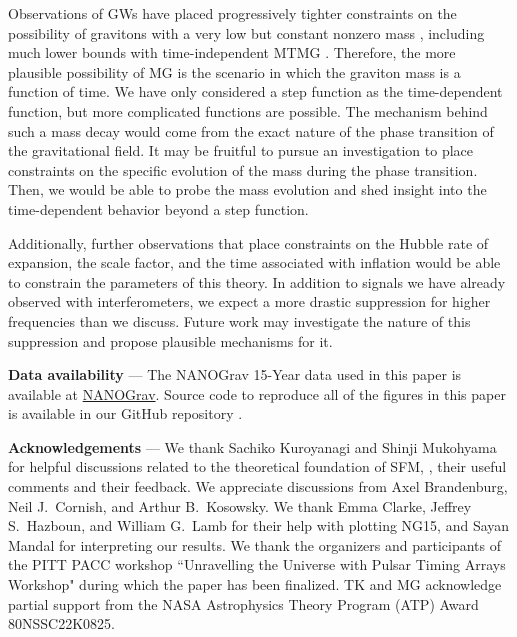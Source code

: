 \documentclass[prd,twocolumn,aps,psfig,nofootinbib,nobibnotes,superscriptaddress,preprintnumbers,times]{revtex4-2}
\begin{document}
Observations of GWs have placed progressively tighter constraints on the possibility of gravitons with a very low but constant nonzero mass \cite{Bernardo:2023mxc, Wu:2023rib, Wang:2023div, deRham:2016nuf}, including much lower bounds with time-independent MTMG \cite{DeFelice:2021trp, DeFelice:2023bwq}. Therefore, the more plausible possibility of MG is the scenario in which the graviton mass is a function of time. We have only considered a step function as the time-dependent function, but more complicated functions are possible. The mechanism behind such a mass decay would come from the exact nature of the phase transition of the gravitational field. It may be fruitful to pursue an investigation to place constraints on the specific evolution of the mass during the phase transition. Then, we would be able to probe the mass evolution and shed insight into the time-dependent behavior beyond a step function. 

Additionally, further observations that place constraints on the Hubble rate of expansion, the scale factor, and the time associated with inflation would be able to constrain the parameters of this theory. In addition to signals we have already observed with interferometers, we expect a more drastic suppression for higher frequencies than we discuss. Future work may investigate the nature of this suppression and propose plausible mechanisms for it.

\vspace{2mm}
{\bf Data availability} --- The NANOGrav 15-Year data used in this paper is available at \href{https://nanograv.org/science/data}{NANOGrav}. Source code to reproduce all of the figures in this paper is available in our GitHub repository \cite{GH}. 

\vspace{2mm}
{\bf Acknowledgements} --- We thank Sachiko Kuroyanagi and Shinji Mukohyama for helpful discussions related to the theoretical foundation of SFM, \cite{Fujita:2018ehq}, their useful comments and their feedback. We appreciate discussions from Axel Brandenburg, Neil J.\ Cornish, and Arthur B.\ Kosowsky. We thank Emma Clarke, Jeffrey S.\ Hazboun, and William G.\ Lamb for their help with plotting NG15, and Sayan Mandal for interpreting our results. We thank the organizers and participants of the PITT PACC workshop ``Unravelling the Universe with Pulsar Timing Arrays Workshop" during which the paper has been finalized. TK and MG acknowledge partial support from the NASA Astrophysics Theory Program (ATP) Award 80NSSC22K0825.




\clearpage
\end{document}
